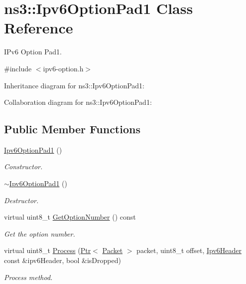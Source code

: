 \hypertarget{classns3_1_1Ipv6OptionPad1}{}\section{ns3\+:\+:Ipv6\+Option\+Pad1 Class Reference}
\label{classns3_1_1Ipv6OptionPad1}


I\+Pv6 Option Pad1.  




{\ttfamily \#include $<$ipv6-\/option.\+h$>$}



Inheritance diagram for ns3\+:\+:Ipv6\+Option\+Pad1\+:


Collaboration diagram for ns3\+:\+:Ipv6\+Option\+Pad1\+:
\subsection*{Public Member Functions}
\begin{DoxyCompactItemize}
\item 
\hyperlink{classns3_1_1Ipv6OptionPad1_ad1737ca3c343a4cf9fef5525ddabe253}{Ipv6\+Option\+Pad1} ()
\begin{DoxyCompactList}\small\item\em Constructor. \end{DoxyCompactList}\item 
\hyperlink{classns3_1_1Ipv6OptionPad1_a14999393580cd7ec9160cf1b744420f1}{$\sim$\+Ipv6\+Option\+Pad1} ()
\begin{DoxyCompactList}\small\item\em Destructor. \end{DoxyCompactList}\item 
virtual uint8\+\_\+t \hyperlink{classns3_1_1Ipv6OptionPad1_adb583cc528cf8fdc1083b58c43323bcf}{Get\+Option\+Number} () const 
\begin{DoxyCompactList}\small\item\em Get the option number. \end{DoxyCompactList}\item 
virtual uint8\+\_\+t \hyperlink{classns3_1_1Ipv6OptionPad1_a412cbc421f3abf2c163df2b8b8edbfde}{Process} (\hyperlink{classns3_1_1Ptr}{Ptr}$<$ \hyperlink{classns3_1_1Packet}{Packet} $>$ packet, uint8\+\_\+t offset, \hyperlink{classns3_1_1Ipv6Header}{Ipv6\+Header} const \&ipv6\+Header, bool \&is\+Dropped)
\begin{DoxyCompactList}\small\item\em Process method. \end{DoxyCompactList}\end{DoxyCompactItemize}
